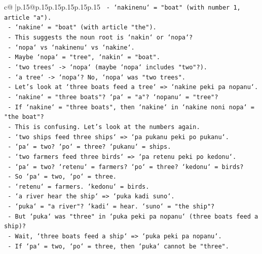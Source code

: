 \documentclass{article}
\begin{document}
{\begin{supertabular}{c@{$\;$}|p{.15\linewidth}@{}p{.15\linewidth}p{.15\linewidth}p{.15\linewidth}p{.15\linewidth}p{.15\linewidth}}
{{{\texttt{         {-} `nakinenu` = "boat" (with number 1, article "a").} \\
\texttt{         {-} `nakine` = "boat" (with article "the").} \\
\texttt{         {-} This suggests the noun root is `nakin` or `nopa`?} \\
\texttt{         {-} `nopa` vs `nakinenu` vs `nakine`.} \\
\texttt{         {-} Maybe `nopa` = "tree", `nakin` = "boat".} \\
\texttt{         {-} `two trees` {-}> `nopa` (maybe `nopa` includes "two"?).} \\
\texttt{         {-} `a tree` {-}> `nopa`? No, `nopa` was "two trees".} \\
\texttt{         {-} Let's look at `three boats feed a tree` => `nakine peki pa nopanu`.} \\
\texttt{           {-} `nakine` = "three boats"? `pa` = "a"? `nopanu` = "tree"?} \\
\texttt{           {-} If `nakine` = "three boats", then `nakine` in `nakine noni nopa` = "the boat"?} \\
\texttt{           {-} This is confusing. Let's look at the numbers again.} \\
\texttt{           {-} `two ships feed three ships` => `pa pukanu peki po pukanu`.} \\
\texttt{             {-} `pa` = two? `po` = three? `pukanu` = ships.} \\
\texttt{           {-} `two farmers feed three birds` => `pa retenu peki po kedonu`.} \\
\texttt{             {-} `pa` = two? `retenu` = farmers? `po` = three? `kedonu` = birds?} \\
\texttt{             {-} So `pa` = two, `po` = three.} \\
\texttt{             {-} `retenu` = farmers. `kedonu` = birds.} \\
\texttt{           {-} `a river hear the ship` => `puka kadi suno`.} \\
\texttt{             {-} `puka` = "a river"? `kadi` = hear. `suno` = "the ship"?} \\
\texttt{             {-} But `puka` was "three" in `puka peki pa nopanu` (three boats feed a ship)?} \\
\texttt{             {-} Wait, `three boats feed a ship` => `puka peki pa nopanu`.} \\
\texttt{               {-} If `pa` = two, `po` = three, then `puka` cannot be "three".} \\
}}}
\end{supertabular}}
\end{document}
